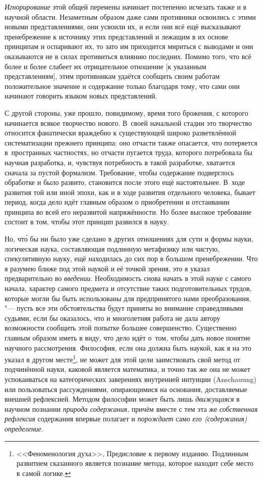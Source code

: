 {\em Игнорирование} этой общей перемены начинает постепенно исчезать также и в
научной области. Незаметным образом даже сами противники освоились с этими
новыми представлениями, они усвоили их, и если они всё ещё высказывают пренебрежение
к источнику этих представлений и лежащим в их основе принципам и оспаривают
их, то зато им приходится мириться с выводами и они оказываются не в
силах противиться влиянию последних. Помимо того, что всё более и более слабеет
их отрицательное отношение [к указанным представлениям], этим противникам удаётся
сообщить своим работам положительное значение и содержание только благодаря
тому, что сами они начинают говорить языком новых представлений.

С другой стороны, уже прошло, повидимому, время того брожения, с которого
начинается всякое творчество нового. В~своей начальной стадии это творчество
относится фанатически враждебно к существующей широко разветвлённой
систематизации прежнего принципа; оно отчасти также опасается, что потеряется
в~пространных частностях, но отчасти пугается труда, которого потребовала бы
научная разработка, и, чувствуя потребность в такой разработке, хватается
сначала за пустой формализм. Требование, чтобы содержание подверглось обработке
и было развито, становится после этого ещё настоятельнее. В~ходе развития той
или иной эпохи, как и в ходе развития отдельного человека, бывает период, когда
дело идёт главным образом о приобретении и отстаивании принципа во всей его
неразвитой напряжённости. Но более высокое требование состоит в том, чтобы этот
принцип развился в науку.

Но, чт\'{о} бы ни было уже сделано в других отношениях для сути и формы науки,
логическая наука, составляющая подлинную метафизику или чистую, спекулятивную
науку, ещё находилась до сих пор в большом пренебрежении. Что я разумею ближе
под этой наукой и её точкой зрения, это я указал предварительно во
{\em введении}. Необходимость снова начать в этой науке с самого начала,
характер самого предмета и отсутствие таких подготовительных трудов, которые
могли бы быть использованы для предпринятого нами преобразования, "--- пусть
все эти обстоятельства будут приняты во внимание справедливыми судьями, если бы
оказалось, что и многолетняя работа не дала автору возможности сообщить этой
попытке большее совершенство. Существенно главным образом иметь в виду, что
дело идёт о~том, чтобы дать новое понятие научного рассмотрения. Философия,
если она должна быть наукой, как я на это указал в другом
месте\footnote{<<Феноменология духа>>, Предисловие к первому изданию. Подлинным
развитием сказанного является познание метода, которое находит себе место в
самой логике.}, не может для этой цели
заимствовать свой метод от подчинённой науки, каковой является математика, и
точно так же она не может успокаиваться на категорических заверениях внутренней
интуиции (Anschauung) или пользоваться рассуждениями, опирающимися на
основания, доставляемые внешней рефлексией. Методом философии может быть лишь
{\em движущаяся} в научном познании {\em природа содержания,} причём вместе с
тем эта же {\em собственная рефлексия} содержания впервые полагает и
{\em порождает} само {\em его (содержания) определение}.

